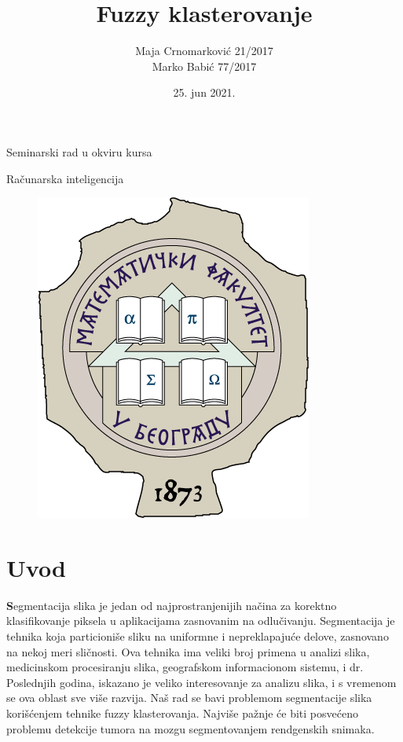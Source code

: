 \documentclass{article}
\begin{document}
\selectfont

\title{{\huge {\selectfont Fuzzy} klasterovanje}}

\author{Maja Crnomarkovi\'{c} 21/2017\\Marko Babi\'{c} 77/2017}
\date{25. jun 2021.}

\maketitle

\centerline{{\normalsize Seminarski rad u okviru kursa}}
\centerline{{\normalsize Ra\v{c}unarska inteligencija}}

\begin{figure}[h]
\vspace{1cm}
\centerline{\includegraphics[scale=0.5]{images/grb.png}}
\end{figure}

\newpage

\renewcommand*\contentsname{\fontencoding{OT2}\selectfont Sadr\v{z}aj}

\tableofcontents

\newpage

\section{\selectfont Uvod}
\textbf Segmentacija slika je jedan od najprostranjenijih na\v{c}ina za korektno klasifikovanje piksela u aplikacijama zasnovanim na odlu\v{c}ivanju. Segmentacija je tehnika koja particioni\v{s}e sliku na uniformne i nepreklapaju\'{c}e delove, zasnovano na nekoj meri sli\v{c}nosti. Ova tehnika ima veliki broj primena u analizi slika, medicinskom procesiranju slika, geografskom informacionom sistemu, i dr. Poslednjih godina, iskazano je veliko interesovanje za analizu slika, i s vremenom se ova oblast sve vi\v{s}e razvija. Na\v{s} rad se bavi problemom segmentacije slika kori\v{s}\'{c}enjem tehnike {\selectfont fuzzy} klasterovanja. Najvi\v{s}e pa\v{z}nje \'{c}e biti posve\'{c}eno problemu detekcije tumora na mozgu segmentovanjem rendgenskih snimaka.
\end{document}
